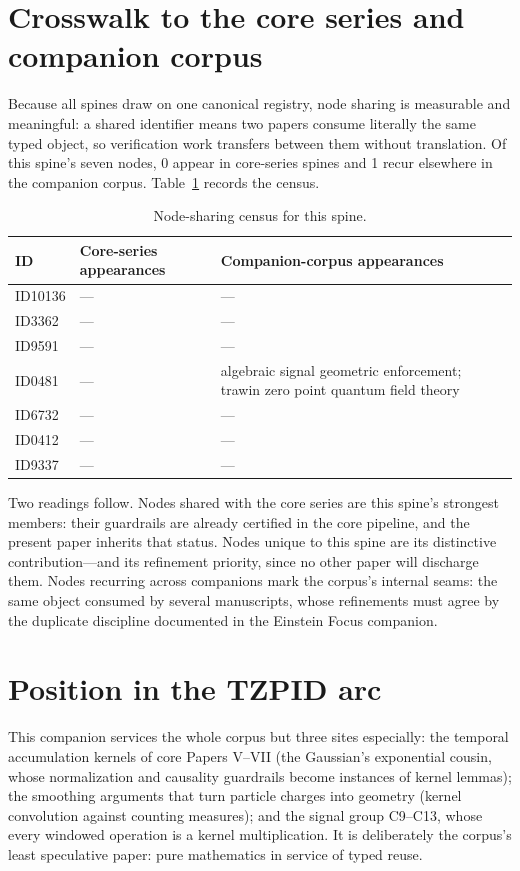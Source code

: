 \documentclass[11pt]{article}
\theoremstyle{remark}
\begin{document}
\section{Crosswalk to the core series and companion corpus}
\label{sec:crosswalk}

Because all spines draw on one canonical registry, node sharing is measurable and meaningful: a shared identifier means two papers consume literally the same typed object, so verification work transfers between them without translation. Of this spine's seven nodes, 0 appear in core-series spines and 1 recur elsewhere in the companion corpus. Table~\ref{tab:crosswalk} records the census.

\begin{table}[ht]
\centering
\small
\caption{Node-sharing census for this spine.}
\label{tab:crosswalk}
\begin{tabular}{lp{4.4cm}p{6.6cm}}
\toprule
ID & Core-series appearances & Companion-corpus appearances \\
\midrule
ID10136 & --- & --- \\
ID3362 & --- & --- \\
ID9591 & --- & --- \\
ID0481 & --- & algebraic signal geometric enforcement; trawin zero point quantum field theory \\
ID6732 & --- & --- \\
ID0412 & --- & --- \\
ID9337 & --- & --- \\
\bottomrule
\end{tabular}
\end{table}

Two readings follow. Nodes shared with the core series are this spine's strongest members: their guardrails are already certified in the core pipeline, and the present paper inherits that status. Nodes unique to this spine are its distinctive contribution---and its refinement priority, since no other paper will discharge them. Nodes recurring across companions mark the corpus's internal seams: the same object consumed by several manuscripts, whose refinements must agree by the duplicate discipline documented in the Einstein Focus companion.

\section{Position in the TZPID arc}
\label{sec:arc}

This companion services the whole corpus but three sites especially: the temporal accumulation kernels of core Papers V--VII (the Gaussian's exponential cousin, whose normalization and causality guardrails become instances of kernel lemmas); the smoothing arguments that turn particle charges into geometry (kernel convolution against counting measures); and the signal group C9--C13, whose every windowed operation is a kernel multiplication. It is deliberately the corpus's least speculative paper: pure mathematics in service of typed reuse.
\end{document}
